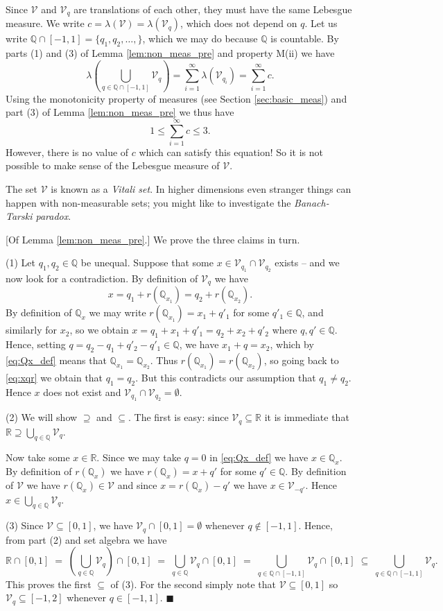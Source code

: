 \documentclass[a4paper]{report}
\newenvironment{proof}{\vspace{0.5ex}\noindent{\textsc{Proof:}}\hspace{0.5em}}{\hfill\qed\vspace{1ex}}
\numberwithin{equation}{chapter}
\numberwithin{thm_counter}{section}
\def\sw{\subseteq} %
\def\mb{\mathbb} %
\def\R{\mb{R}} %
\def\Q{\mb{Q}}
\def\qed{$\blacksquare$}
\def\l{\left}
\def\r{\right}
\begin{document}
Since $\mathscr{V}$ and $\mathscr{V}_q$ are translations of each other, they must have the same Lebesgue measure.
We write $c=\lambda(\mathscr{V})=\lambda(\mathscr{V}_q)$, which does not depend on $q$.
Let us write $\Q\cap[-1,1]=\{q_1,q_2,\ldots,\}$, which we may do because $\Q$ is countable.
By parts (1) and (3) of Lemma \ref{lem:non_meas_pre} and property M(ii) we have 
$$\lambda\l(\bigcup_{q\in\Q\cap[-1,1]} \mathscr{V}_q\r)=\sum\limits_{i=1}^\infty\lambda(\mathscr{V}_{q_i})=\sum\limits_{i=1}^\infty c.$$
Using the monotonicity property of measures (see Section \ref{sec:basic_meas}) and part (3) of Lemma \ref{lem:non_meas_pre} we thus have
$$1\leq \sum\limits_{i=1}^\infty c\leq 3.$$
However, there is no value of $c$ which can satisfy this equation!
So it is not possible to make sense of the Lebesgue measure of $\mathscr{V}$. 

The set $\mathscr{V}$ is known as a \textit{Vitali set}. In higher dimensions even stranger things can happen with non-measurable sets; you might like to investigate the \textit{Banach-Tarski paradox}. 


\newpage
\begin{proof}[Of Lemma \ref{lem:non_meas_pre}.] We prove the three claims in turn.

(1) Let $q_1,q_2\in\Q$ be unequal. Suppose that some $x\in \mathscr{V}_{q_1}\cap\mathscr{V}_{q_2}$ exists -- and we now look for a contradiction.
By definition of $\mathscr{V}_q$ we have
\begin{equation}\label{eq:xqr}
x=q_1+r(\Q_{x_1})=q_2+r(\Q_{x_2}).
\end{equation}
By definition of $\Q_x$ we may write $r(\Q_{x_1})=x_1+q'_1$ for some $q'_1\in\Q$, and similarly for $x_2$, so we obtain
$x=q_1+x_1+q'_1=q_2+x_2+q'_2$
where $q,q'\in\Q$. Hence, setting $q=q_2-q_1+q'_2-q'_1\in\Q$, we have $x_1+q=x_2$, which by \eqref{eq:Qx_def} means that $\Q_{x_1}=\Q_{x_2}$. 
Thus $r(\Q_{x_1})=r(\Q_{x_2})$, so going back to \eqref{eq:xqr} we obtain that $q_1=q_2$. But this contradicts our assumption that $q_1\neq q_2$. Hence $x$ does not exist and $\mathscr{V}_{q_1}\cap\mathscr{V}_{q_2}=\emptyset$.

(2) We will show $\supseteq$ and $\subseteq$. The first is easy: since $\mathscr{V}_q\sw\R$ it is immediate that $\R\supseteq \bigcup_{q\in\Q} \mathscr{V}_q$.

Now take some $x\in\R$. Since we may take $q=0$ in \eqref{eq:Qx_def} we have $x\in\Q_x$. By definition of $r(\Q_x)$ we have
$r(\Q_x)=x+q'$ for some $q'\in\Q$. By definition of $\mathscr{V}$ we have $r(\Q_x)\in\mathscr{V}$ and since
$x=r(\Q_x)-q'$ we have $x\in \mathscr{V}_{-q'}$. Hence $x\in\bigcup_{q\in\Q} \mathscr{V}_q$. 

(3) 
Since $\mathscr{V}\sw[0,1]$, we have $\mathscr{V}_q\cap[0,1]=\emptyset$ whenever $q\notin [-1,1]$. 
Hence,
from part (2) and set algebra we have
$$\R\cap[0,1]\;=\;\l(\bigcup_{q\in\Q}\mathscr{V}_q\r)\cap[0,1]\;=\;\bigcup_{q\in\Q}\mathscr{V}_q\cap[0,1]
\;=\; \bigcup_{q\in\Q\cap[-1,1]}\mathscr{V}_q\cap[0,1]\;\sw\; \bigcup_{q\in\Q\cap[-1,1]}\mathscr{V}_q.$$
This proves the first $\subseteq$ of (3). For the second simply note that $\mathscr{V}\sw[0,1]$ so $\mathscr{V}_q\sw[-1,2]$ whenever $q\in[-1,1]$.
\end{proof}
\end{document}
